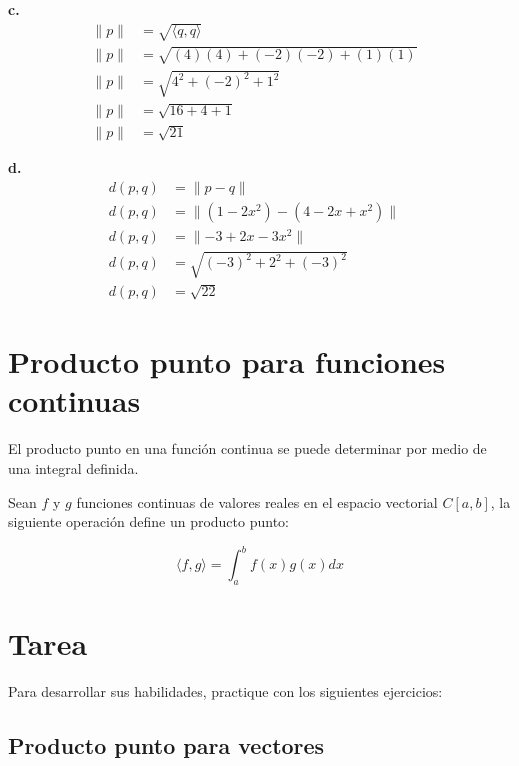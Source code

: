 \documentclass{article}
\begin{document}
    \textbf{c.}
        \begin{align*}
            \parallel p\parallel&= \sqrt{\langle q,q\rangle} & \\
            \parallel p\parallel&= \sqrt{(4)(4)+(-2)(-2)+(1)(1)} \\
            \parallel p\parallel&=\sqrt{4^{2}+(-2)^{2}+1^{2}} & \\
            \parallel p\parallel&= \sqrt{16+4+1} & \\
            \parallel p\parallel&= \sqrt{21}
        \end{align*}

    \textbf{d.}
        \begin{align*}
            d(p,q)&= \parallel p-q\parallel & \\
            d(p,q)&= \parallel (1-2x^{2})-(4-2x+x^{2})\parallel & \\
            d(p,q)&= \parallel -3+2x-3x^{2}\parallel & \\
            d(p,q)&= \sqrt{(-3)^{2}+2^{2}+(-3)^{2}} & \\
            d(p,q)&= \sqrt{22}
        \end{align*}

\section{Producto punto para funciones continuas}

    El producto punto en una función continua se puede determinar por medio de una integral definida.

    Sean $f$ y $g$ funciones continuas de valores reales en el espacio vectorial $C[a, b]$, la siguiente operación define un producto punto:

    \begin{equation}
        \langle f, g\rangle=\int_{a}^{b} f(x) g(x) d x
    \end{equation}

\section{Tarea}

    Para desarrollar sus habilidades, practique con los siguientes ejercicios:

    \subsection{Producto punto para vectores}
\end{document}
